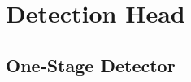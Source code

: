\documentclass[a4paper]{article}
\begin{document}


\section{Detection Head}

\subsection{One-Stage Detector}
\end{document}
